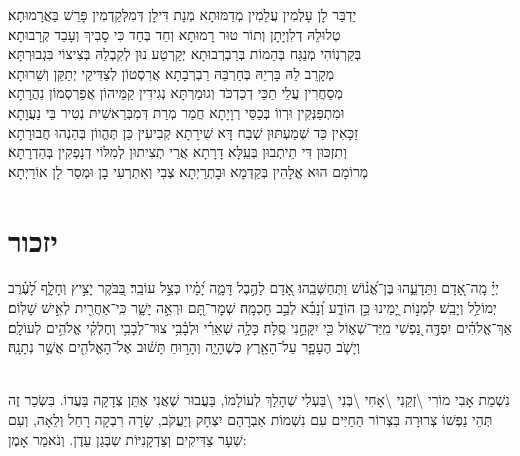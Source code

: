 \begin{footnotesize}
\shatz
יַדְבַּר לָן עָלְמִין עֲלֵמִין מְדַמּוּתָא מְנָת דִּילָן דְּמִלְּקַדְמִין פָּרֵשׁ בַּאֲרָמוּתָא׃\\
\kahal
טְלוּלֵהּ דְלִוְיָתָן וְתוֹר טוּר רָמוּתָא וְחַד בְּחַד כִּי סָבִיךְ וְעָבֵד קְרָבוּתָא׃\\
\shatz
בְּקַרְנֽוֹהִי מְנַגַּח בְּהֵמוֹת בְּרַבְרְבוּתָא יְקַרְטַע נוּן לְקִבְלֵהּ בְּצִיצוֹי בִּגְבוּרְתָּא׃\\
\kahal
מְקָרֵב לֵהּ בָּרְיֵהּ בְּחַרְבֵּהּ רַבְרְבָתָא אֲרִסְטוֹן לְצַדִּיקֵי יְתַקֵּן וְשֵׁרוּתָא׃\\
\shatz
מְסַחֲרִין עֲלֵי תַכֵּי דְכַדְכֹּד וְגוּמַרְתָּא נְגִידִין קַמֵּיהוֹן אֲפַרְסְמוֹן נַהֲרָתָא׃\\
\kahal
וּמִתְפַּנְּקִין וּרְווֹ בְּכַסֵּי רְוָיָתָא חֲמַר מְרַת דְּמִבְּרֵאשִׁית נְטִיר בֵּי נַעֲוָתָא׃\\
\shatz
זַכָּאִין כַּד שְׁמַעְתּוּן שְׁבַח דָּא שִׁירָתָא קְבִיעִין כֵּן תֶּהֱווֹן בְּהַנְהוּ חֲבוּרָתָא׃\\
\kahal
וְתִזְכּוּן דִּי תֵיתְבוּן בְּעֵֽלָּא דָרָתָא אֲרֵי תְצִיתוּן לְמִלּוֹי דְנָפְקִין בְּהַדְרָתָא׃\\
\shatz
מְרוֹמָם הוּא אֱלָהִין בְּקַדְמָא וּבָתְרַיְתָא צְבִי וְאִתְרְעִי בָן וּמְסַר לָן אוֹרַיְתָא׃\\ 
\end{footnotesize}

\section[יזכור]{ יזכור }


יְיָ֗ מָֽה־אָ֭דָם וַתֵּדָעֵ֑הוּ בֶּן־אֱ֝נ֗וֹשׁ וַתְּחַשְּׁבֵֽהוּ׃ אָ֭דָם לַהֶ֣בֶל דָּמָ֑ה יָ֝מָ֗יו כְּצֵ֣ל עוֹבֵֽר׃
בַּ֭בֹּקֶר יָצִ֣יץ וְחָלָ֑ף לָ֝עֶ֗רֶב יְמוֹלֵ֥ל וְיָבֵֽשׁ׃ לִמְנ֣וֹת יָ֭מֵינוּ כֵּ֣ן הוֹדַ֑ע וְ֝נָבִ֗א לְבַ֣ב חׇכְמָֽה׃
שְׁמׇר־תָּ֭ם וּרְאֵ֣ה יָשָׁ֑ר כִּֽי־אַחֲרִ֖ית לְאִ֣ישׁ שָׁלֽוֹם׃
אַךְ־אֱלֹהִ֗ים יִפְדֶּ֣ה נַ֭פְשִׁי מִֽיַּד־שְׁא֑וֹל כִּ֖י יִקָּחֵ֣נִי סֶֽלָה׃ 
כָּלָ֥ה שְׁאֵרִ֗י וּלְבָ֫בִ֥י צוּר־לְבָבִ֥י וְחֶלְקִ֗י אֱלֹהִ֥ים לְעוֹלָֽם׃ 
וְיָשֹׁ֧ב הֶעָפָ֛ר עַל־הָאָ֖רֶץ כְּשֶׁהָיָ֑ה וְהָר֣וּחַ תָּשׁ֔וּב אֶל־הָאֱלֹהִ֖ים אֲשֶׁ֥ר נְתָנָֽהּ׃

\\
נִשְׁמַת אָבִי מוֹרִי \textbackslash זְקֵנִי \textbackslash אָחִי \textbackslash בְּנִי \textbackslash בַּעְלִי  שְׁהָלַךְ לְעוֹלָמוֹ, בַּעֲבוּר שֶׁאֲנִי אֶתֵּן צְדָקָה בַּעֲדוֹ. בִּשְׂכַר זֶה תְּהֵי נַפְשׁוֹ צְרוּרָה בִּצְרוֹר הַחַיִּים עִם נִשְׁמוֹת אַבְרָהַם יִצְחָק וְיַעֲקֹב, שָׂרָה רִבְקָה רָחֵל וְלֵאָה, וְעִם שְׁעָר צַדִּיקִים וְצַדְקָנִיּוֹת שְבְּגַן עֵדֶן. וְנֹאמַר אָמֶן:


